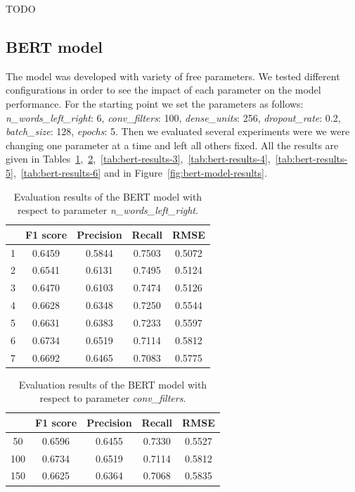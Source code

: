 \documentclass[11pt,a4paper]{article}
\begin{document}
TODO

\subsection{BERT model}

The model was developed with variety of free parameters.
We tested different configurations in order to see the impact of each parameter on the model performance.
For the starting point we set the parameters as follows: \textit{n\_words\_left\_right}: 6, \textit{conv\_filters}: 100, \textit{dense\_units}: 256, \textit{dropout\_rate}: 0.2, \textit{batch\_size}: 128, \textit{epochs}: 5.
Then we evaluated several experiments were we were changing one parameter at a time and left all others fixed.
All the results are given in Tables~\ref{tab:bert-results-1},~\ref{tab:bert-results-2},~\ref{tab:bert-results-3},~\ref{tab:bert-results-4},~\ref{tab:bert-results-5},~\ref{tab:bert-results-6} and in Figure~\ref{fig:bert-model-results}.

\begin{table}[h]
\centering
\begin{tabular}{ccccc}
  & F1 score & Precision & Recall & RMSE   \\ \hline
1 & 0.6459   & 0.5844    & 0.7503 & 0.5072 \\
2 & 0.6541   & 0.6131    & 0.7495 & 0.5124 \\
3 & 0.6470   & 0.6103    & 0.7474 & 0.5126 \\
4 & 0.6628   & 0.6348    & 0.7250 & 0.5544 \\
5 & 0.6631   & 0.6383    & 0.7233 & 0.5597 \\
6 & 0.6734   & 0.6519    & 0.7114 & 0.5812 \\
7 & 0.6692   & 0.6465    & 0.7083 & 0.5775
\end{tabular}
\caption{Evaluation results of the BERT model with respect to parameter \textit{n\_words\_left\_right}.}
\label{tab:bert-results-1}
\end{table}

\begin{table}[h]
\centering
\begin{tabular}{ccccc}
    & F1 score & Precision & Recall & RMSE   \\ \hline
50  & 0.6596   & 0.6455    & 0.7330 & 0.5527 \\
100 & 0.6734   & 0.6519    & 0.7114 & 0.5812 \\
150 & 0.6625   & 0.6364    & 0.7068 & 0.5835
\end{tabular}
\caption{Evaluation results of the BERT model with respect to parameter \textit{conv\_filters}.}
\label{tab:bert-results-2}
\end{table}
\end{document}
